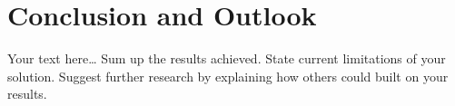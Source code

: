 \chapter{Conclusion and Outlook}
\label{chap:conclusion}
\chapterstart

Your text here\ldots
Sum up the results achieved. State current limitations of your solution. Suggest further research by explaining how others could built on your results.

\chapterend



%
